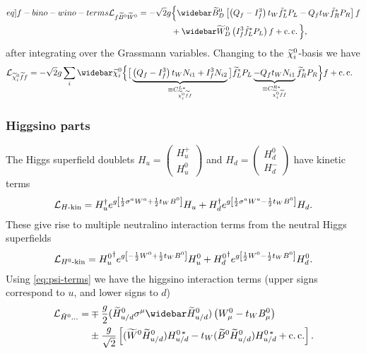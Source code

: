 \documentclass[english, notitlepage]{article}
\begin{document}
            \begin{align} \label[eq]{f-bino-wino-terms} \nonumber
                \L_{f\bino\wino} = -\sqrt{2} g & \Big\{ \wbar{\wtilde{B}}^0_D \bclosed{ \pclosed{Q_f - I^3_f}t_W \tilde{f}_L^* P_L - Q_f t_W \tilde{f}_R^* P_R } f \\
                                               & + \wbar{\wtilde{W}}^0_D \pclosed{I^3_f \tilde{f}_L^* P_L} f + \cc \Big\},
            \end{align}
            after integrating over the Grassmann variables.
            Changing to the $\nino[i]$-basis we have
            \begin{align} \label{eq:nino-sf-f-terms}
                \L_{\nino[i]\wtilde{f}f} = -\sqrt{2} g   \sum_{i} \wbar{\wtilde{\chi}}^0_i & \Big\{ \big[ \underbrace{\pclosed{Q_f - I^3_f}t_W N_{i1}  + I^3_f N_{i2}}_{\equiv C_{\nino[i] \wtilde{f} f}^{L*}} \big] \wtilde{f}_L^* P_L \underbrace{- Q_f t_W N_{i1}}_{\equiv C_{\nino[i] \wtilde{f} f}^{R*}} \wtilde{f}_R^* P_R \Big\} f + \cc
            \end{align}

        \subsubsection{Higgsino parts}
            The Higgs superfield doublets $H_u = \begin{pmatrix} H_u^+ \\ H_u^0 \end{pmatrix}$ and $H_d = \begin{pmatrix} H_d^0 \\ H_d^- \end{pmatrix}$ have kinetic terms
            \begin{align}
                \L_{H\text{-kin}} = H_u^\dag \exp{g\bclosed{\frac{1}{2}\sigma^a W^a + \frac{1}{2}t_W B^0}} H_u + H_d^\dag \exp{g\bclosed{\frac{1}{2}\sigma^a W^a - \frac{1}{2}t_WB^0}} H_d.
            \end{align}
            These give rise to multiple neutralino interaction terms from the neutral Higgs superfields
            \begin{align}
                \L_{H^0\text{-kin}} = {H_u^0}^\dag \exp{g\bclosed{-\frac{1}{2}W^0 + \frac{1}{2}t_W B^0}} H_u^0 + {H_d^0}^\dag \exp{g\bclosed{\frac{1}{2}W^0 - \frac{1}{2}t_W B^0}} H_d^0.
            \end{align}
            Using \cref{eq:psi-terms} we have the higgsino interaction terms (upper signs correspond to $u$, and lower signs to $d$)
            \begin{align} \nonumber
                \L_{\tilde{H}^0...} = & \mp \frac{g}{2} (\wtilde{H}^0_{u/d} \sigma^\mu \wbar{\wtilde{H}}^0_{u/d})\pclosed{W^0_\mu - t_W B^0_\mu}                                        \\
                                      & \pm \frac{g}{\sqrt{2}} \bclosed{(\wtilde{W}^0 \wtilde{H}^0_{u/d}) H^{0\,*}_{u/d} - t_W (\wtilde{B}^0 \wtilde{H}^0_{u/d}) H^{0\,*}_{u/d} + \cc}.
            \end{align}
\end{document}
